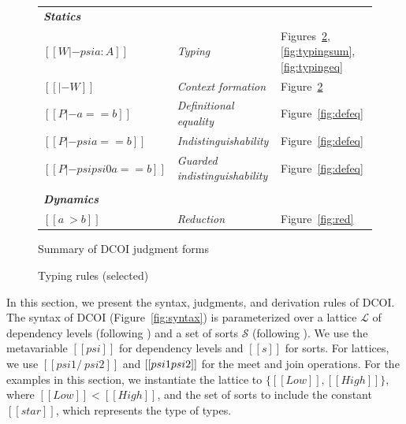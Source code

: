 \documentclass[acmsmall]{acmart}
\newcommand{\name}{DCOI\xspace}
\begin{document}
\ifextended
\begin{figure}[t]
\begin{tabular}{lll}
\textbf{\emph{Statics}} & %
\\
$[[W |- psi a : A]]$ & \textit{Typing} & Figures~\ref{fig:typing},
                                         \ref{fig:typingsum}, \ref{fig:typingeq}  \\
$[[|- W]]$ & \textit{Context formation} & Figure~\ref{fig:typing}   \\
$[[P |- a == b]]$ & \textit{Definitional equality} & Figure~\ref{fig:defeq}  \\
$[[P |- psi a == b]]$ & \textit{Indistinguishability} & Figure~\ref{fig:defeq}  \\
$[[P |- psi psi0 a == b]]$ & \textit{Guarded indistinguishability} & Figure~\ref{fig:defeq}  \\
\\
\textbf{\emph{Dynamics}}& %
\\
$[[a ~> b]]$ & \textit{Reduction} & Figure~\ref{fig:red}   
\\
\end{tabular}
\caption{Summary of \name{} judgment forms}
\label{fig:judgments}
\end{figure}
\fi

\begin{figure}[h]
\begin{minipage}{0.9\textwidth}
\end{minipage}
\caption{Typing rules (selected)}
\label{fig:typing}
\end{figure}

In this section, we present the syntax, judgments, and derivation rules of
\name{}.  The syntax of \name{} (Figure~\ref{fig:syntax}) is parameterized
over a lattice $\mathcal{L}$ of dependency levels (following \citet{abadi1999core}) and a
set of sorts $\mathcal{S}$ (following \citet{barendregt:lambda-calculi-with-types}).  We use the metavariable
$[[psi]]$ for dependency levels and $[[s]]$ for sorts. For lattices, we use
$[[psi1 /\ psi2]]$ and $[[psi1 \/ psi2]]$ for the meet and join operations.  For
the examples in this section, we instantiate the lattice to $\{[[Low]], [[High]]\}$, where
$[[Low]] < [[High]]$, and the set of sorts to include the constant $[[star]]$, which
represents the type of types.
\end{document}
